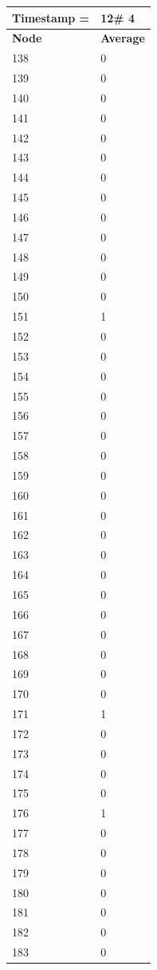 \begin{tabular}{|l||l|}
\hline
\textbf{Timestamp =} & \textbf{12}\# 4\\\hline
	\textbf{Node} & \textbf{Average} \\ \hline
\hline
	138 & 0 \\ \hline
	139 & 0 \\ \hline
	140 & 0 \\ \hline
	141 & 0 \\ \hline
	142 & 0 \\ \hline
	143 & 0 \\ \hline
	144 & 0 \\ \hline
	145 & 0 \\ \hline
	146 & 0 \\ \hline
	147 & 0 \\ \hline
	148 & 0 \\ \hline
	149 & 0 \\ \hline
	150 & 0 \\ \hline
	151 & 1 \\ \hline
	152 & 0 \\ \hline
	153 & 0 \\ \hline
	154 & 0 \\ \hline
	155 & 0 \\ \hline
	156 & 0 \\ \hline
	157 & 0 \\ \hline
	158 & 0 \\ \hline
	159 & 0 \\ \hline
	160 & 0 \\ \hline
	161 & 0 \\ \hline
	162 & 0 \\ \hline
	163 & 0 \\ \hline
	164 & 0 \\ \hline
	165 & 0 \\ \hline
	166 & 0 \\ \hline
	167 & 0 \\ \hline
	168 & 0 \\ \hline
	169 & 0 \\ \hline
	170 & 0 \\ \hline
	171 & 1 \\ \hline
	172 & 0 \\ \hline
	173 & 0 \\ \hline
	174 & 0 \\ \hline
	175 & 0 \\ \hline
	176 & 1 \\ \hline
	177 & 0 \\ \hline
	178 & 0 \\ \hline
	179 & 0 \\ \hline
	180 & 0 \\ \hline
	181 & 0 \\ \hline
	182 & 0 \\ \hline
	183 & 0 \\ \hline
\end{tabular}
